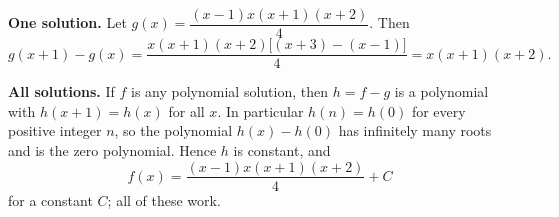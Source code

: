\textbf{One solution.} Let $g(x)=\dfrac{(x-1)x(x+1)(x+2)}{4}$. Then
\[g(x+1)-g(x)=\dfrac{x(x+1)(x+2)\big[(x+3)-(x-1)\big]}{4}=x(x+1)(x+2).\]

\textbf{All solutions.} If $f$ is any polynomial solution, then $h=f-g$ is a polynomial with $h(x+1)=h(x)$ for all $x$. In particular $h(n)=h(0)$ for every positive integer $n$, so the polynomial $h(x)-h(0)$ has infinitely many roots and is the zero polynomial. Hence $h$ is constant, and
\[\boxed{f(x)=\dfrac{(x-1)x(x+1)(x+2)}{4}+C}\]
for a constant $C$; all of these work.
